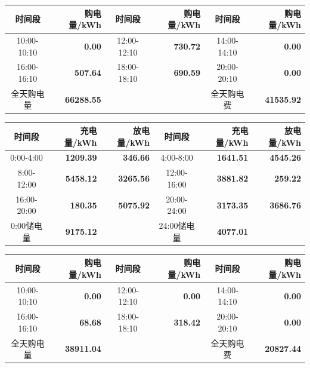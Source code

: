 {\setlength{\tabcolsep}{2pt}
\begin{center}
\begin{tabular}{|c|r|c|r|c|r|}
\hline
时间段 & 购电量/kWh & 时间段 & 购电量/kWh & 时间段 & 购电量/kWh \\
\hline10:00-10:10 & \textbf{0.00} & 12:00-12:10 & \textbf{730.72} & 14:00-14:10 & \textbf{0.00} \\
\hline16:00-16:10 & \textbf{507.64} & 18:00-18:10 & \textbf{690.59} & 20:00-20:10 & \textbf{0.00} \\
\hline
全天购电量 & \textbf{66288.55} & & & 全天购电费 & \textbf{41535.92} \\
\hline
\end{tabular}
\par{}

\vspace{0.15\baselineskip}
\begin{tabular}{|c|r|r|c|r|r|}
\hline
时间段 & 充电量/kWh & 放电量/kWh & 时间段 & 充电量/kWh & 放电量/kWh \\
\hline0:00-4:00 & \textbf{1209.39} & \textbf{346.66} & 4:00-8:00 & \textbf{1641.51} & \textbf{4545.26} \\
\hline8:00-12:00 & \textbf{5458.12} & \textbf{3265.56} & 12:00-16:00 & \textbf{3881.82} & \textbf{259.22} \\
\hline16:00-20:00 & \textbf{180.35} & \textbf{5075.92} & 20:00-24:00 & \textbf{3173.35} & \textbf{3686.76} \\
\hline0:00储电量 & \textbf{9175.12} & & 24:00储电量 & \textbf{4077.01} & \\
\hline
\end{tabular}
\par{}

\vspace{0.15\baselineskip}
\begin{tabular}{|c|r|c|r|c|r|}
\hline
时间段 & 购电量/kWh & 时间段 & 购电量/kWh & 时间段 & 购电量/kWh \\
\hline10:00-10:10 & \textbf{0.00} & 12:00-12:10 & \textbf{0.00} & 14:00-14:10 & \textbf{0.00} \\
\hline16:00-16:10 & \textbf{68.68} & 18:00-18:10 & \textbf{318.42} & 20:00-20:10 & \textbf{0.00} \\
\hline
全天购电量 & \textbf{38911.04} & & & 全天购电费 & \textbf{20827.44} \\
\hline
\end{tabular}
\par{}


\end{center}}
